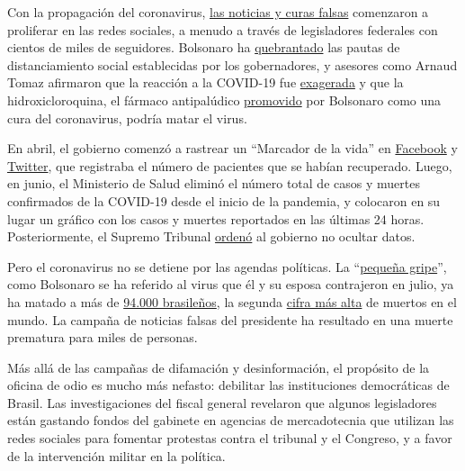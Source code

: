 Con la propagación del coronavirus,
\href{https://www.bbc.com/news/53361876}{las noticias y curas falsas}
comenzaron a proliferar en las redes sociales, a menudo a través de
legisladores federales con cientos de miles de seguidores. Bolsonaro ha
\href{https://www.hrw.org/news/2020/04/10/brazil-bolsonaro-sabotages-anti-covid-19-efforts}{quebrantado}
las pautas de distanciamiento social establecidas por los gobernadores,
y asesores como Arnaud Tomaz afirmaron que la reacción a la COVID-19 fue
\href{https://www.bbc.com/portuguese/brasil-53353594}{exagerada} y que
la hidroxicloroquina, el fármaco antipalúdico
\href{https://www.nytimes.com/2020/06/13/world/americas/virus-brazil-bolsonaro-chloroquine.html}{promovido}
por Bolsonaro como una cura del coronavirus, podría matar el virus.

En abril, el gobierno comenzó a rastrear un ``Marcador de la vida'' en
\href{https://www.facebook.com/minsaude/posts/3549590468392877}{Facebook}
y
\href{https://twitter.com/secomvc/status/1257836970518200323}{Twitter},
que registraba el número de pacientes que se habían recuperado. Luego,
en junio, el Ministerio de Salud eliminó el número total de casos y
muertes confirmados de la COVID-19 desde el inicio de la pandemia, y
colocaron en su lugar un gráfico con los casos y muertes reportados en
las últimas 24 horas. Posteriormente, el Supremo Tribunal
\href{https://www.nytimes.com/2020/06/19/world/coronavirus-live-updates.html}{ordenó}
al gobierno no ocultar datos.

Pero el coronavirus no se detiene por las agendas políticas. La
``\href{https://www.cnn.com/2020/05/23/americas/brazil-coronavirus-hospitals-intl/index.html}{pequeña
gripe}'', como Bolsonaro se ha referido al virus que él y su esposa
contrajeron en julio, ya ha matado a más de
\href{https://www.nytimes.com/interactive/2020/world/americas/brazil-coronavirus-cases.html}{94.000
brasileños}, la segunda
\href{https://coronavirus.jhu.edu/map.html}{cifra más alta} de muertos
en el mundo. La campaña de noticias falsas del presidente ha resultado
en una muerte prematura para miles de personas.

Más allá de las campañas de difamación y desinformación, el propósito de
la oficina de odio es mucho más nefasto: debilitar las instituciones
democráticas de Brasil. Las investigaciones del fiscal general revelaron
que algunos legisladores están gastando fondos del gabinete en agencias
de mercadotecnia que utilizan las redes sociales para fomentar protestas
contra el tribunal y el Congreso, y a favor de la intervención militar
en la política.


